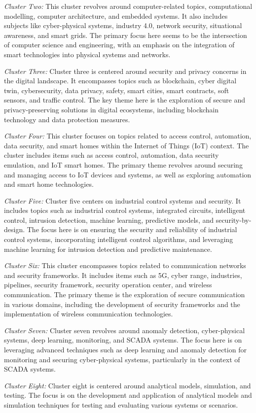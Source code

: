 \textit{Cluster Two:}
This cluster revolves around computer-related topics, computational modelling, computer architecture, and embedded systems. It also includes subjects like cyber-physical systems, industry 4.0, network security, situational awareness, and smart grids. The primary focus here seems to be the intersection of computer science and engineering, with an emphasis on the integration of smart technologies into physical systems and networks.

\textit{Cluster Three:}
Cluster three is centered around security and privacy concerns in the digital landscape. It encompasses topics such as blockchain, cyber digital twin, cybersecurity, data privacy, safety, smart cities, smart contracts, soft sensors, and traffic control. The key theme here is the exploration of secure and privacy-preserving solutions in digital ecosystems, including blockchain technology and data protection measures.

\textit{Cluster Four:}
This cluster focuses on topics related to access control, automation, data security, and smart homes within the Internet of Things (IoT) context. The cluster includes items such as access control, automation, data security emulation, and IoT smart homes. The primary theme revolves around securing and managing access to IoT devices and systems, as well as exploring automation and smart home technologies.

\textit{Cluster Five:}
Cluster five centers on industrial control systems and security. It includes topics such as industrial control systems, integrated circuits, intelligent control, intrusion detection, machine learning, predictive models, and security-by-design. The focus here is on ensuring the security and reliability of industrial control systems, incorporating intelligent control algorithms, and leveraging machine learning for intrusion detection and predictive maintenance.

\textit{Cluster Six:}
This cluster encompasses topics related to communication networks and security frameworks. It includes items such as 5G, cyber range, industries, pipelines, security framework, security operation center, and wireless communication. The primary theme is the exploration of secure communication in various domains, including the development of security frameworks and the implementation of wireless communication technologies.

\textit{Cluster Seven:}
Cluster seven revolves around anomaly detection, cyber-physical systems, deep learning, monitoring, and SCADA systems. The focus here is on leveraging advanced techniques such as deep learning and anomaly detection for monitoring and securing cyber-physical systems, particularly in the context of SCADA systems.

\textit{Cluster Eight:}
Cluster eight is centered around analytical models, simulation, and testing. The focus is on the development and application of analytical models and simulation techniques for testing and evaluating various systems or scenarios.